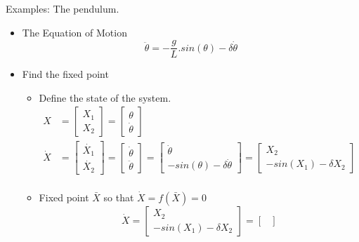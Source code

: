 \documentclass{article}
\begin{document}
Examples: The pendulum.
\begin{itemize}
  \item The Equation of Motion
    \begin{equation}
      \ddot{\theta} = -\frac{g}{L}.sin(\theta) - \delta\dot{\theta}
    \end{equation}
  \item Find the fixed point
    \begin{itemize}
      \item Define the state of the system.
        \begin{equation}
          \begin{aligned}
          X &=  \begin{bmatrix} X_{1} \\ X_{2} \end{bmatrix} = 
                \begin{bmatrix}  {\theta} \\ {\dot{\theta} } \end{bmatrix} \\
          \dot{X} &=  \begin{bmatrix} \dot{X_{1}} \\ \dot{X_{2}} \end{bmatrix} = 
                      \begin{bmatrix} \dot{\theta} \\ \ddot{\theta}  \end{bmatrix} =
                      \begin{bmatrix} \dot{\theta} \\ -sin(\theta) -{\delta\dot{\theta}}  \end{bmatrix} = 
                      \begin{bmatrix} X_{2}\\ -sin(X_{1}) -{\delta X_{2} } \end{bmatrix} \\
          \end{aligned}
          \end{equation}
      \item Fixed point $\bar{X}$ so that $\dot{X} = f(\bar{X}) = 0$
        \begin{equation}
            \dot{X} =  
              \begin{bmatrix} 
                X_{2}\\ -sin(X_{1}) -\delta X_{2} 
              \end{bmatrix} 
              =
              \begin{bmatrix} 

\end{bmatrix}
\end{equation}
\end{itemize}
\end{itemize}
\end{document}

